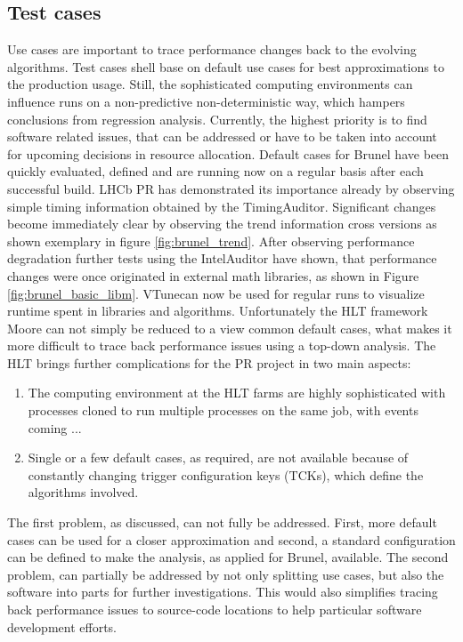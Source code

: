 \documentclass[a4paper]{jpconf}
\begin{document}
\subsection{Test cases}
\label{sec:test_cases}

Use cases are important to trace performance changes back to the evolving algorithms. Test cases shell base on default use cases for best approximations to the production usage. Still, the sophisticated computing environments can influence runs on a non-predictive non-deterministic way, which hampers conclusions from regression analysis. Currently, the highest priority is to find software related issues, that can be addressed or have to be taken into account for upcoming decisions in resource allocation.
\newline
Default cases for Brunel have been quickly evaluated, defined and are running now on a regular basis after each successful build. LHCb PR has demonstrated its importance already by observing simple timing information obtained by the TimingAuditor. Significant changes become immediately clear by observing the trend information cross versions as shown exemplary in figure \ref{fig:brunel_trend}. After observing performance degradation further tests using the IntelAuditor have shown, that performance changes were once originated in external math libraries, as shown in Figure \ref{fig:brunel_basic_libm}. VTune\texttrademark can now be used for regular runs to visualize runtime spent in libraries and algorithms.
\newline
Unfortunately the HLT framework Moore can not simply be reduced to a view common default cases, what makes it more difficult to trace back performance issues using a top-down analysis. The HLT brings further complications for the PR project in two main aspects:
\begin{enumerate}
 \item The computing environment at the HLT farms are highly sophisticated with processes cloned to run multiple processes on the same job, with events coming ...
 \item Single or a few default cases, as required, are not available because of constantly changing trigger configuration keys (TCKs), which define the algorithms involved.
\end{enumerate}
The first problem, as discussed, can not fully be addressed. First, more default cases can be used for a closer approximation and second, a standard configuration can be defined to make the analysis, as applied for Brunel, available. The second problem, can partially be addressed by not only splitting use cases, but also the software into parts for further investigations. This would also simplifies tracing back performance issues to source-code locations to help particular software development efforts. 
\end{document}
